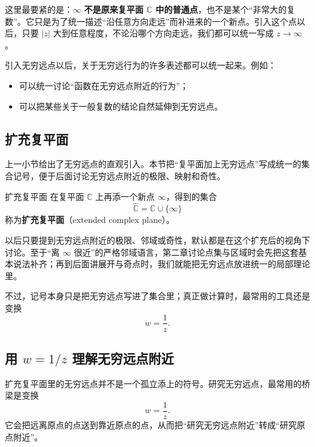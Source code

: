 \begin{zhu}{}{}
这里最要紧的是：$\infty$ \textbf{不是原来复平面 $\mathbb{C}$ 中的普通点}，也不是某个``非常大的复数''。它只是为了统一描述``沿任意方向走远''而补进来的一个新点。引入这个点以后，只要 $|z|$ 大到任意程度，不论沿哪个方向走远，我们都可以统一写成 $z\to\infty$。
\end{zhu}

引入无穷远点以后，关于无穷远行为的许多表述都可以统一起来。例如：
\begin{itemize}
    \item 可以统一讨论``函数在无穷远点附近的行为''；
    \item 可以把某些关于一般复数的结论自然延伸到无穷远点。
\end{itemize}

\subsection{扩充复平面}

上一小节给出了无穷远点的直观引入。本节把``复平面加上无穷远点''写成统一的集合记号，便于后面讨论无穷远点附近的极限、映射和奇性。

\begin{dingliyi}{扩充复平面}{}
在复平面 $\mathbb{C}$ 上再添一个新点 $\infty$，得到的集合
\begin{equation}
    \hat{\mathbb{C}}=\mathbb{C}\cup\{\infty\}
\end{equation}
称为\textbf{扩充复平面}（extended complex plane）。
\end{dingliyi}

\begin{zhu}{}{}
以后只要提到无穷远点附近的极限、邻域或奇性，默认都是在这个扩充后的视角下讨论。至于``离 $\infty$ 很近''的严格邻域语言，第二章讨论点集与区域时会先把这套基本说法补齐；再到后面讲展开与奇点时，我们就能把无穷远点放进统一的局部理论里。
\end{zhu}

不过，记号本身只是把无穷远点写进了集合里；真正做计算时，最常用的工具还是变换
\[
w=\frac{1}{z}.
\]

\subsection{用 \texorpdfstring{$w=1/z$}{w=1/z} 理解无穷远点附近}

扩充复平面里的无穷远点并不是一个孤立添上的符号。研究无穷远点，最常用的桥梁是变换
\begin{equation}
    w=\frac{1}{z}.
\end{equation}
它会把远离原点的点送到靠近原点的点，从而把``研究无穷远点附近''转成``研究原点附近''。

